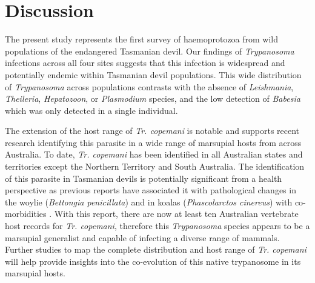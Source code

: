 \documentclass[a4paper, nobind]{templates/ociamthesis}
\begin{document}
\hypertarget{discussion-2}{%
\section{Discussion}\label{discussion-2}}

The present study represents the first survey of haemoprotozoa from wild populations of the endangered Tasmanian devil. Our findings of \emph{Trypanosoma} infections across all four sites suggests that this infection is widespread and potentially endemic within Tasmanian devil populations. This wide distribution of \emph{Trypanosoma} across populations contrasts with the absence of \emph{Leishmania}, \emph{Theileria}, \emph{Hepatozoon}, or \emph{Plasmodium} species, and the low detection of \emph{Babesia} which was only detected in a single individual.

The extension of the host range of \emph{Tr. copemani} is notable and supports recent research identifying this parasite in a wide range of marsupial hosts from across Australia. To date, \emph{Tr. copemani} has been identified in all Australian states and territories except the Northern Territory and South Australia. The identification of this parasite in Tasmanian devils is potentially significant from a health perspective as previous reports have associated it with pathological changes in the woylie (\emph{Bettongia penicillata}) \autocite{boteroTrypanosomesGeneticDiversity2013,thompsonTemporalSpatialDynamics2014} and in koalas (\emph{Phascolarctos cinereus}) with co-morbidities \autocite{mcinnesPotentialImpactNative2011}. With this report, there are now at least ten Australian vertebrate host records for \emph{Tr. copemani}, therefore this \emph{Trypanosoma} species appears to be a marsupial generalist and capable of infecting a diverse range of mammals. Further studies to map the complete distribution and host range of \emph{Tr. copemani} will help provide insights into the co-evolution of this native trypanosome in its marsupial hosts.
\end{document}
